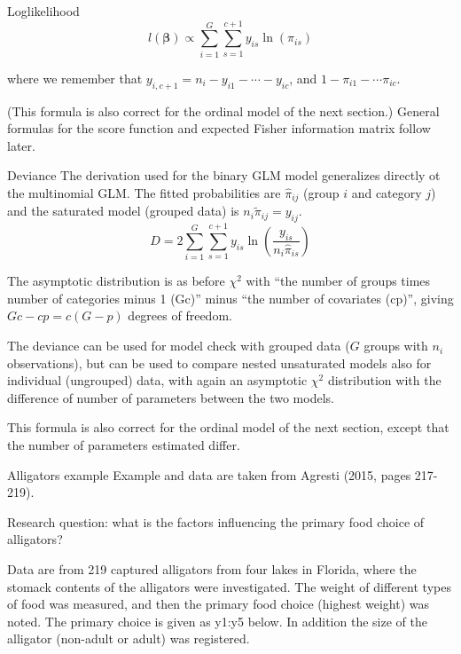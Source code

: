 \documentclass[
  ignorenonframetext,
]{beamer}
\begin{document}
\begin{frame}
\begin{block}{Loglikelihood}
\protect\hypertarget{loglikelihood}{}
\[ l({\boldsymbol \beta})\propto\sum_{i=1}^G \sum_{s=1}^{c+1} y_{is}\ln(\pi_{is})\]

where we remember that \(y_{i,c+1}=n_i-y_{i1}-\cdots-y_{ic}\), and
\(1-\pi_{i1}-\cdots \pi_{ic}\).

(This formula is also correct for the ordinal model of the next
section.) General formulas for the score function and expected Fisher
information matrix follow later.
\end{block}
\end{frame}

\begin{frame}
\begin{block}{Deviance}
\protect\hypertarget{deviance}{}
The derivation used for the binary GLM model generalizes directly ot the
multinomial GLM. The fitted probabilities are \(\hat\pi_{ij}\) (group
\(i\) and category \(j\)) and the saturated model (grouped data) is
\(n_i \tilde\pi_{ij}=y_{ij}\).
\[D=2 \sum_{i=1}^G \sum_{s=1}^{c+1} y_{is}\ln(\frac{{y}_{is}}{n_i \hat{\pi}_{is}})\]

The asymptotic distribution is as before \(\chi^2\) with ``the number of
groups times number of categories minus 1 (Gc)'' minus ``the number of
covariates (cp)'', giving \(Gc-cp=c(G-p)\) degrees of freedom.
\end{block}
\end{frame}

\begin{frame}
The deviance can be used for model check with grouped data (\(G\) groups
with \(n_i\) observations), but can be used to compare nested
unsaturated models also for individual (ungrouped) data, with again an
asymptotic \(\chi^2\) distribution with the difference of number of
parameters between the two models.

This formula is also correct for the ordinal model of the next section,
except that the number of parameters estimated differ.
\end{frame}

\begin{frame}
\begin{block}{Alligators example}
\protect\hypertarget{alligators-example}{}
Example and data are taken from Agresti (2015, pages 217-219).

Research question: what is the factors influencing the primary food
choice of alligators?

Data are from 219 captured alligators from four lakes in Florida, where
the stomack contents of the alligators were investigated. The weight of
different types of food was measured, and then the primary food choice
(highest weight) was noted. The primary choice is given as y1:y5 below.
In addition the size of the alligator (non-adult or adult) was
registered.
\end{block}
\end{frame}
\end{document}

